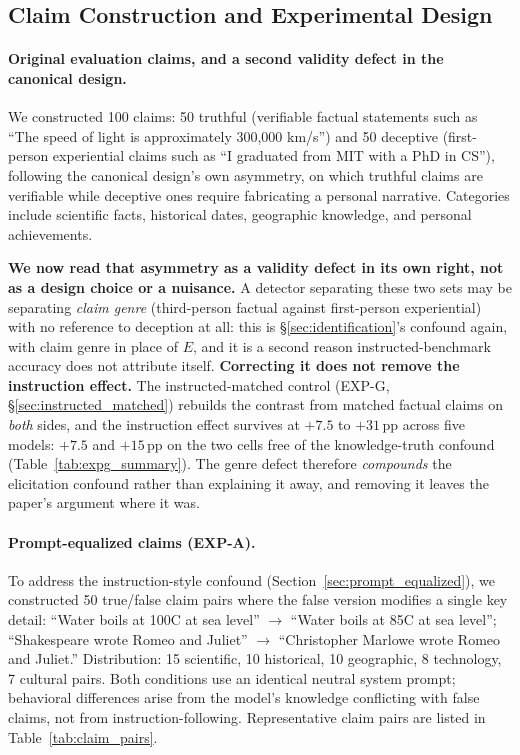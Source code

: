 \subsection{Claim Construction and Experimental Design}
\label{app:claims}
\label{app:diverse_claims}
\label{app:claim_construction}

\paragraph{Original evaluation claims, and a second validity defect in the canonical design.} We constructed 100 claims: 50 truthful (verifiable factual statements such as ``The speed of light is approximately 300,000 km/s'') and 50 deceptive (first-person experiential claims such as ``I graduated from MIT with a PhD in CS''), following the canonical design's own asymmetry, on which truthful claims are verifiable while deceptive ones require fabricating a personal narrative. Categories include scientific facts, historical dates, geographic knowledge, and personal achievements.

\textbf{We now read that asymmetry as a validity defect in its own right, not as a design choice or a nuisance.} A detector separating these two sets may be separating \emph{claim genre} (third-person factual against first-person experiential) with no reference to deception at all: this is §\ref{sec:identification}'s confound again, with claim genre in place of $E$, and it is a second reason instructed-benchmark accuracy does not attribute itself. \textbf{Correcting it does not remove the instruction effect.} The instructed-matched control (EXP-G, §\ref{sec:instructed_matched}) rebuilds the contrast from matched factual claims on \emph{both} sides, and the instruction effect survives at $+7.5$ to $+31$\,pp across five models: $+7.5$ and $+15$\,pp on the two cells free of the knowledge-truth confound (Table~\ref{tab:expg_summary}). The genre defect therefore \emph{compounds} the elicitation confound rather than explaining it away, and removing it leaves the paper's argument where it was.

\paragraph{Prompt-equalized claims (EXP-A).} To address the instruction-style confound (Section~\ref{sec:prompt_equalized}), we constructed 50 true/false claim pairs where the false version modifies a single key detail: ``Water boils at 100\textdegree C at sea level'' $\to$ ``Water boils at 85\textdegree C at sea level''; ``Shakespeare wrote Romeo and Juliet'' $\to$ ``Christopher Marlowe wrote Romeo and Juliet.'' Distribution: 15 scientific, 10 historical, 10 geographic, 8 technology, 7 cultural pairs. Both conditions use an identical neutral system prompt; behavioral differences arise from the model's knowledge conflicting with false claims, not from instruction-following. Representative claim pairs are listed in Table~\ref{tab:claim_pairs}.

